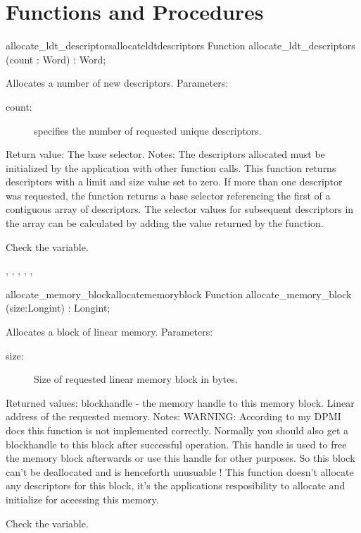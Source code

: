\section{Functions and Procedures}
\begin{functionl}{allocate\_ldt\_descriptors}{allocateldtdescriptors}
\Declaration
Function allocate\_ldt\_descriptors (count : Word) : Word;

\Description
Allocates a number of new descriptors.
Parameters: 
\begin{description}
\item[count:\ ] specifies the number of requested unique descriptors.
\end{description}
Return value: The base selector.
Notes: The descriptors allocated must be initialized by the application with
other function calls. This function returns descriptors with a limit and
size value set to zero. If more than one descriptor was requested, the
function returns a base selector referencing the first of a contiguous array
of descriptors. The selector values for subsequent descriptors in the array
can be calculated by adding the value returned by the
function.

\Errors
 Check the  variable. 
\SeeAlso

,
,
,
,
,

\end{functionl}
\latex{}
\html{}
\begin{functionl}{allocate\_memory\_block}{allocatememoryblock}
\Declaration
Function allocate\_memory\_block (size:Longint) : Longint;

\Description
Allocates a block of linear memory.
Parameters: 
\begin{description}
\item[size:\ ] Size of requested linear memory block in bytes.
\end{description}
Returned values: blockhandle - the memory handle to this memory block. Linear
address of the requested memory.
Notes: WARNING: According to my DPMI docs this function is not implemented
correctly. Normally you should also get a blockhandle to this block after
successful operation. This handle is used to free the memory block
afterwards or use this handle for other purposes. So this block can't be
deallocated and is henceforth unusuable !
This function doesn't allocate any descriptors for this block, it's the
applications resposibility to allocate and initialize for accessing this
memory.

\Errors
 Check the  variable.
\SeeAlso
\end{functionl}
